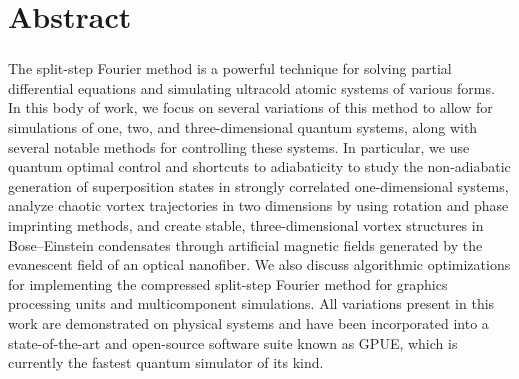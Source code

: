 \chapter*{Abstract} 
\subsection*{\thesistitle}

The split-step Fourier method is a powerful technique for solving partial differential equations and simulating ultracold atomic systems of various forms.
In this body of work, we focus on several variations of this method to allow for simulations of one, two, and three-dimensional quantum systems, along with several notable methods for controlling these systems.
In particular, we use quantum optimal control and shortcuts to adiabaticity to study the non-adiabatic generation of superposition states in strongly correlated one-dimensional systems, analyze chaotic vortex trajectories in two dimensions by using rotation and phase imprinting methods, and create stable, three-dimensional vortex structures in Bose--Einstein condensates through artificial magnetic fields generated by the evanescent field of an optical nanofiber.
We also discuss algorithmic optimizations for implementing the compressed split-step Fourier method for graphics processing units and multicomponent simulations.
All variations present in this work are demonstrated on physical systems and have been incorporated into a state-of-the-art and open-source software suite known as GPUE, which is currently the fastest quantum simulator of its kind.

